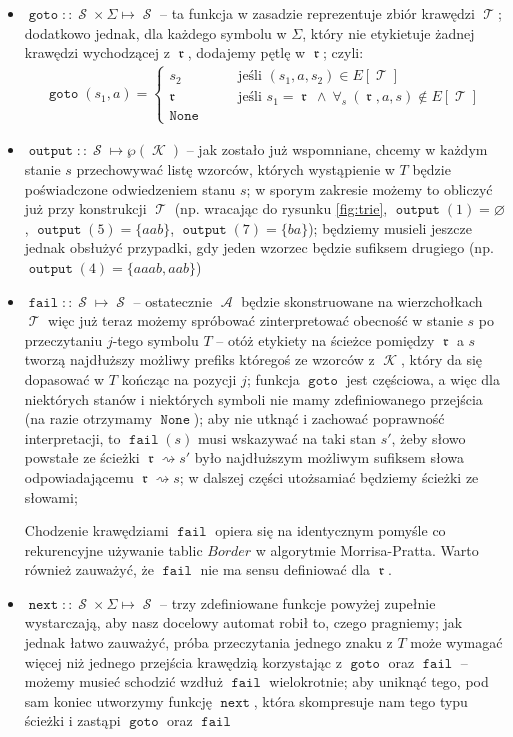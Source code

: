 \documentclass{article}
\let\emptyset\varnothing
\DeclareMathOperator{\rot}{\mathfrak{r}}
\DeclareMathOperator{\K}{\mathcal{K}}
\DeclareMathOperator{\A}{\mathcal{A}}
\DeclareMathOperator{\states}{\mathcal{S}}
\DeclareMathOperator{\trie}{\mathcal{T}}
\DeclareMathOperator{\goto}{\texttt{goto}}
\DeclareMathOperator{\next}{\texttt{next}}
\DeclareMathOperator{\fail}{\texttt{fail}}
\DeclareMathOperator{\out}{\texttt{output}}
\DeclareMathOperator{\none}{\texttt{None}}
\begin{document}
\begin{itemize}
    \item $\goto::\states\times\Sigma\mapsto\states$ -- ta funkcja w zasadzie reprezentuje zbiór krawędzi $\trie$; dodatkowo jednak, dla każdego symbolu w $\Sigma$, który nie etykietuje żadnej krawędzi wychodzącej z $\rot$, dodajemy pętlę w $\rot$; czyli:
    \begin{gather*}
        \goto(s_1, a)=\begin{cases}
        s_2 &\qquad \text{jeśli } (s_1,a,s_2)\in E[\trie] \\
        \rot &\qquad \text{jeśli } s_1=\rot\ \wedge\ \forall_{s}\ (\rot,a,s)\notin E[\trie] \\
        \none
        \end{cases}
    \end{gather*}
    
    \item $\out::\states\mapsto\wp(\K)$ -- jak zostało już wspomniane, chcemy w każdym stanie $s$ przechowywać listę wzorców, których wystąpienie w $T$ będzie poświadczone odwiedzeniem stanu $s$; w sporym zakresie możemy to obliczyć już przy konstrukcji $\trie$ (np. wracając do rysunku \ref{fig:trie}, $\out(1)=\emptyset$, $\out(5)=\{aab\}$, $\out(7)=\{ba\}$); będziemy musieli jeszcze jednak obsłużyć przypadki, gdy jeden wzorzec będzie sufiksem drugiego (np. $\out(4)=\{aaab, aab\}$)
    
    \item $\fail::\states\mapsto\states$ --     ostatecznie $\A$ będzie skonstruowane na wierzchołkach $\trie$ więc już teraz możemy spróbować zinterpretować obecność w stanie $s$ po przeczytaniu $j$-tego symbolu $T$ -- otóż etykiety na ścieżce pomiędzy $\rot$ a $s$ tworzą najdłuższy możliwy prefiks któregoś ze wzorców z $\K$, który da się dopasować w $T$ kończąc na pozycji $j$; funkcja $\goto$ jest częściowa, a więc dla niektórych stanów i niektórych symboli nie mamy zdefiniowanego przejścia (na razie otrzymamy $\none$); aby nie utknąć i zachować poprawność interpretacji, to $\fail(s)$ musi wskazywać na taki stan $s'$, żeby słowo powstałe ze ścieżki $\rot\rightsquigarrow s'$ było najdłuższym możliwym sufiksem słowa odpowiadającemu $\rot\rightsquigarrow s$; w dalszej części utożsamiać będziemy ścieżki ze słowami;
    
    Chodzenie krawędziami $\fail$ opiera się na identycznym pomyśle co rekurencyjne używanie tablic $Border$ w algorytmie Morrisa-Pratta. Warto również zauważyć, że $\fail$ nie ma sensu definiować dla $\rot$.
    
    \item $\next::\states\times\Sigma\mapsto\states$ -- trzy zdefiniowane funkcje powyżej zupełnie wystarczają, aby nasz docelowy automat robił to, czego pragniemy; jak jednak łatwo zauważyć, próba przeczytania jednego znaku z $T$ może wymagać więcej niż jednego przejścia krawędzią korzystając z $\goto$ oraz $\fail$ -- możemy musieć schodzić wzdłuż $\fail$ wielokrotnie; aby uniknąć tego, pod sam koniec utworzymy funkcję $\next$, która skompresuje nam tego typu ścieżki i zastąpi $\goto$ oraz $\fail$
\end{itemize}
\end{document}
